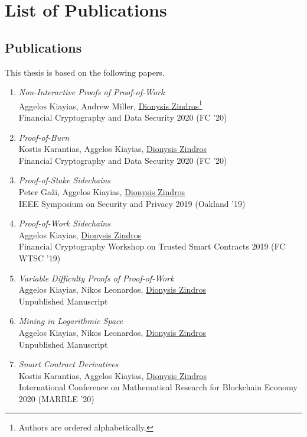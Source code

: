 \ifuniversity
\chapter*{List of Publications}
\thispagestyle{empty}
\else
\section*{Publications}
\fi

This thesis is based on the following papers.

\begin{enumerate}
  \item
    \emph{Non-Interactive Proofs of Proof-of-Work}\nocite{nipopows}\\
    Aggelos Kiayias, Andrew Miller, \underline{Dionysis Zindros}\footnote{\label{footnote-authors-alphabetic}Authors are ordered alphabetically.}\\
    Financial Cryptography and Data Security 2020 (FC '20)
  \item
    \emph{Proof-of-Burn}\nocite{burn}\\
    Kostis Karantias, Aggelos Kiayias, \underline{Dionysis Zindros}\\
    Financial Cryptography and Data Security 2020 (FC '20)
  \item
    \emph{Proof-of-Stake Sidechains}\nocite{pos-sidechains}\\
    Peter Ga\v{z}i, Aggelos Kiayias, \underline{Dionysis Zindros}\\
    IEEE Symposium on Security and Privacy 2019 (Oakland '19)
  \item
    \emph{Proof-of-Work Sidechains}\nocite{pow-sidechains}\\
    Aggelos Kiayias, \underline{Dionysis Zindros}\\
    Financial Cryptography Workshop on Trusted Smart Contracts 2019 (FC WTSC '19)
  \item
    \emph{Variable Difficulty Proofs of Proof-of-Work}\nocite{varnipopows}\\
    Aggelos Kiayias, Nikos Leonardos, \underline{Dionysis Zindros}\\
    Unpublished Manuscript
  \item
    \emph{Mining in Logarithmic Space}\nocite{logspace}\\
    Aggelos Kiayias, Nikos Leonardos, \underline{Dionysis Zindros}\\
    Unpublished Manuscript
  \item
    \emph{Smart Contract Derivatives}\nocite{derivatives}\\
    Kostis Karantias, Aggelos Kiayias, \underline{Dionysis Zindros}\\
    International Conference on Mathematical Research for Blockchain Economy 2020 (MARBLE '20)\\
\end{enumerate}

